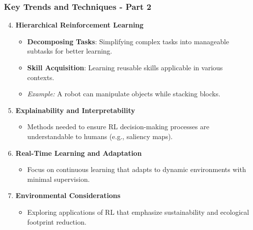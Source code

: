 \documentclass[aspectratio=169]{beamer}
\begin{document}
\begin{frame}[fragile]
    \frametitle{Key Trends and Techniques - Part 2}
    \begin{enumerate}
        \setcounter{enumi}{3}
        \item \textbf{Hierarchical Reinforcement Learning}
        \begin{itemize}
            \item \textbf{Decomposing Tasks}: Simplifying complex tasks into manageable subtasks for better learning.
            \item \textbf{Skill Acquisition}: Learning reusable skills applicable in various contexts.
            \item \textit{Example:} A robot can manipulate objects while stacking blocks.
        \end{itemize}

        \item \textbf{Explainability and Interpretability}
        \begin{itemize}
            \item Methods needed to ensure RL decision-making processes are understandable to humans (e.g., saliency maps).
        \end{itemize}

        \item \textbf{Real-Time Learning and Adaptation}
        \begin{itemize}
            \item Focus on continuous learning that adapts to dynamic environments with minimal supervision.
        \end{itemize}

        \item \textbf{Environmental Considerations}
        \begin{itemize}
            \item Exploring applications of RL that emphasize sustainability and ecological footprint reduction.
        \end{itemize}
    \end{enumerate}
\end{frame}
\end{document}
